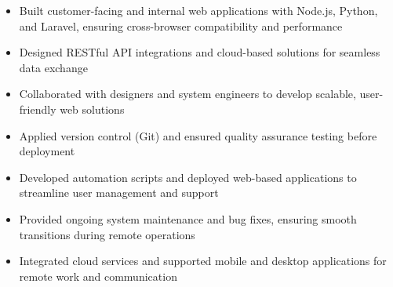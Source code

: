 \par\smallskip
\begin{minipage}{13.75cm}
  \begin{minipage}{6.5cm}
    \begin{itemize}
      \item Built customer-facing and internal web applications with Node.js, Python, and Laravel, ensuring cross-browser compatibility and performance
      \item Designed RESTful API integrations and cloud-based solutions for seamless data exchange
    \end{itemize}
  \end{minipage}
  \hfill
  \begin{minipage}{6.5cm}
    \begin{itemize}
      \item Collaborated with designers and system engineers to develop scalable, user-friendly web solutions
      \item Applied version control (Git) and ensured quality assurance testing before deployment
    \end{itemize}
  \end{minipage}
\end{minipage}
\par\smallskip
\divider

\par\smallskip
\begin{minipage}{13.75cm}
  \begin{minipage}{6.5cm}
    \begin{itemize}
      \item Developed automation scripts and deployed web-based applications to streamline user management and support
      \item Provided ongoing system maintenance and bug fixes, ensuring smooth transitions during remote operations
    \end{itemize}
  \end{minipage}
  \hfill
  \begin{minipage}{6.5cm}
    \begin{itemize}
      \item Integrated cloud services and supported mobile and desktop applications for remote work and communication
    \end{itemize}
  \end{minipage}
\end{minipage}

